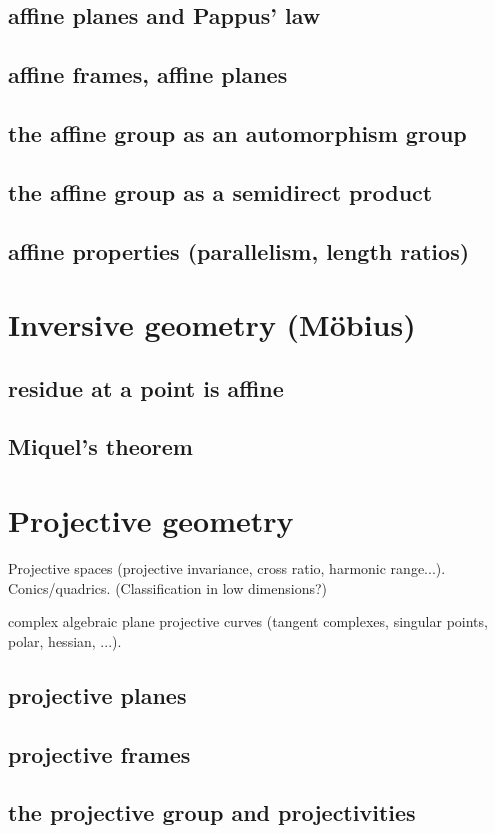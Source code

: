 \subsection{affine planes and Pappus' law}
\subsection{affine frames, affine planes}
\subsection{the affine group as an automorphism group}
\subsection{the affine group as a semidirect product}
\subsection{affine properties (parallelism, length ratios)}

\section{Inversive geometry (Möbius)}
\subsection{residue at a point is affine}
\subsection{Miquel's theorem}

\section{Projective geometry}
Projective spaces (projective invariance, cross ratio, harmonic range...). Conics/quadrics. (Classification in low dimensions?)
\par
complex algebraic plane projective curves (tangent complexes, singular points, polar, hessian, ...).
\subsection{projective planes}
\subsection{projective frames}
\subsection{the projective group and projectivities}
